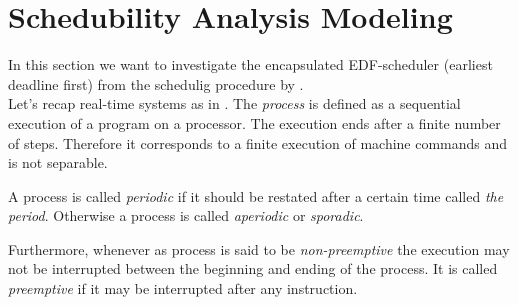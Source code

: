 \section{Schedubility Analysis Modeling}









In this section we want to investigate the encapsulated EDF-scheduler (earliest deadline first) from the schedulig procedure by \cite{K}. \\

Let's recap \glspl{real-time system} as in \cite{KBK}.
The {\itshape process} is defined as a sequential execution of a program on a processor. 
The execution ends after a finite number of steps. 
Therefore it corresponds to a finite execution of machine commands and is not separable.\\
\begin{definition}
	A process is called {\itshape periodic} if it should be restated after a certain time called {\itshape the period}. 
	Otherwise a process is called {\itshape aperiodic} or {\itshape sporadic}.


Furthermore, whenever as process is said to be {\itshape non-preemptive} the execution may not be interrupted between the beginning and ending of the process. 
It is called {\itshape preemptive} if it may be interrupted after any instruction.
\end{definition}  
 
